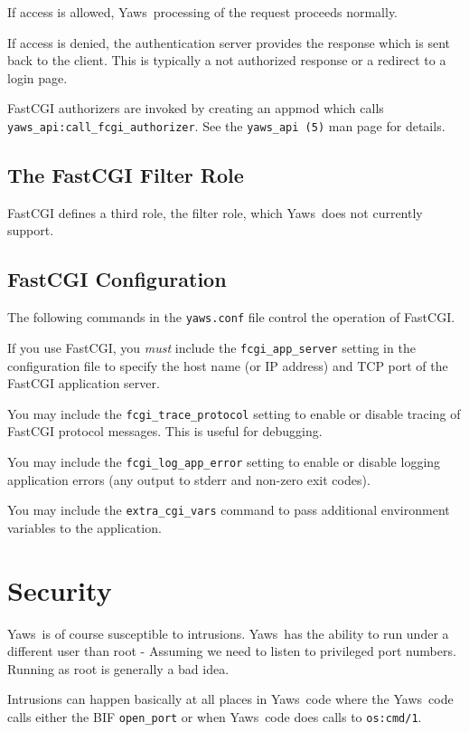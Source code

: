 \documentclass[11pt,oneside,english]{book}
\newcommand{\Yaws}            %
        {{\sc Yaws}}
\begin{document}
If access is allowed, \Yaws\  processing of the request proceeds
normally.

If access is denied, the authentication server provides the
response which is sent back to the client. This is typically
a not authorized response or a redirect to a login page.

FastCGI authorizers are invoked by creating an appmod which
calls \verb+yaws_api:call_fcgi_authorizer+.
See the \verb+yaws_api (5)+ man page for details.

\section{The FastCGI Filter Role}

FastCGI defines a third role, the filter role, which
\Yaws\  does not currently support.


\section{FastCGI Configuration}

The following commands in the \verb+yaws.conf+ file control the
operation of FastCGI.

If you use FastCGI, you \emph{must} include the \verb+fcgi_app_server+
setting in the configuration file to specify the host name (or IP address)
and TCP port of the FastCGI application server.

You may include the \verb+fcgi_trace_protocol+ setting to enable or disable
tracing of FastCGI protocol messages. This is useful for debugging.

You may include the \verb+fcgi_log_app_error+ setting to enable or disable
logging application errors (any output to stderr and non-zero exit codes).

You may include the \verb+extra_cgi_vars+ command to pass additional
environment variables to the application.


\chapter{Security}

\Yaws\  is of course susceptible to intrusions. \Yaws\  has the
ability to run under a different user than root - Assuming we need
to listen to privileged port numbers. Running as root is generally a
bad idea.

Intrusions can happen basically at all places in \Yaws\  code where the
\Yaws\  code calls either the BIF \verb+open_port+ or when \Yaws\  code
does calls to \verb+os:cmd/1+.
\end{document}
